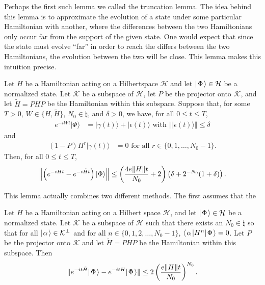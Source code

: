 \documentclass[../thesis-main/thesis-main]{subfiles}
\begin{document}
Perhaps the first such lemma we called the truncation lemma.  The idea behind this lemma is to approximate the evolution of a state under some particular Hamiltonian with another, where the differences between the two Hamiltonians only occur far from the support of the given state.  One would expect that since the state must evolve ``far'' in order to reach the differs between the two Hamiltonians, the evolution between the two will be close.  This lemma makes this intuition precise.

\begin{lemma}
\label{lem:truncation}
Let $H$ be a Hamiltonian acting on a Hilbertspace $\mathcal{H}$ and let $|\mspace{2mu} \Phi \mspace{2mu} \rangle\in\mathcal{H}$ be a normalized state. Let
$\mathcal{K}$ be a subspace of $\mathcal{H}$, let $P$ be the projector onto $\mathcal{K}$,
and let $\tilde{H}=PHP$ be the Hamiltonian within this subspace. Suppose
that, for some $T>0$, $W\in\{H,\tilde{H}\}$, $N_0\in\natural$,
and $\delta>0$, we have, for all $0\leq t\leq T$, 
\begin{align*}
e^{-iWt}|\Phi\rangle & = |\gamma(t)\rangle+|\epsilon(t)\rangle \text{ with }
\left\Vert |\epsilon(t)\rangle\right\Vert \leq \delta
\end{align*}
and
\begin{align*}
  (1-P) H^{r}|\gamma(t)\rangle & = 0 \text{ for all } r\in\{0,1,\ldots, N_0-1\}.
\end{align*}
Then, for all $0\leq t \leq T$, 
\[
  \left\|{\left(e^{-iHt}-e^{-i\tilde{H}t}\right)|\Phi\rangle}\right\|
  \leq \left(\frac{4e\|{H}\|t}{N_0} + 2 \right) 
        \left(\delta + 2^{-N_0}(1+\delta)\right).
\]
\end{lemma}

This lemma actually combines two different methods.  The first assumes that the 


\begin{proposition}
\label{pro:trunc_prop}Let $H$ be a Hamiltonian acting on a Hilbert
space $\mathcal{H}$, and let $|\mspace{2mu} \Phi \mspace{2mu} \rangle\in\mathcal{H}$ be a normalized state. Let
$\mathcal{K}$ be a subspace of $\mathcal{H}$ such that there exists an $N_0\in\natural$
so that for all $|\mspace{2mu} \alpha \mspace{2mu} \rangle\in \mathcal{K}^{\perp}$ and for all $n\in\{0,1,2,\ldots, N_0-1\}$, $\langle\mspace{2mu} \alpha \mspace{2mu} |H^{n}|\mspace{2mu} \Phi \mspace{2mu} \rangle=0$.
Let $P$ be the projector onto $\mathcal{K}$ and let $\tilde{H}=PHP$ be
the Hamiltonian within this subspace.  Then
\[
\|{e^{-it\tilde{H}}|\mspace{2mu} \Phi \mspace{2mu} \rangle-e^{-itH}|\mspace{2mu} \Phi \mspace{2mu} \rangle}\| \leq 2\left(\frac{e\|{H}\|t}{N_0}\right)^{N_0}.
\]
\end{proposition}
\end{document}
